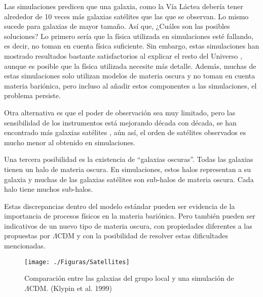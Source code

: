 \documentclass[a4paper,openright,12pt]{book}
\begin{document}
Las simulaciones predicen que una galaxia, como la Vía Láctea debería tener alrededor de 10 veces más galaxias satélites que las que se observan. Lo mismo sucede para galaxias de mayor tamaño. Así que, ¿Cuáles son las posibles soluciones? Lo primero sería que la física utilizada en simulaciones esté fallando, es decir, no toman en cuenta física suficiente. Sin embargo, estas simulaciones han mostrado resultados bastante satisfactorios al explicar el resto del Universo \cite{1.2.5}, aunque es posible que la física utilizada necesite más detalle. Además, muchas de estas simulaciones solo utilizan modelos de materia oscura y no toman en cuenta materia bariónica, pero incluso al añadir estos componentes a las simulaciones, el problema persiste.

Otra alternativa es que el poder de observación sea muy limitado, pero las sensibilidad de los instrumentos está mejorando década con década, se han encontrado más galaxias satélites \cite{1.2.6}, aún así, el orden de satélites observados es mucho menor al obtenido en simulaciones.

Una tercera posibilidad es la existencia de ``galaxias oscuras''. Todas las galaxias tienen un halo de materia oscura. En simulaciones, estos halos representan a su galaxia y muchas de las galaxias satélites son sub-halos de materia oscura. Cada halo tiene muchos sub-halos. 

Estas discrepancias dentro del modelo estándar pueden ser evidencia de la importancia de procesos físicos en la materia bariónica. Pero también pueden ser indicativos de un nuevo tipo de materia oscura, con propiedades diferentes a las propuestas por $\Lambda$CDM y con la posibilidad de resolver estas dificultades mencionadas.

\begin{figure}
\centering
 \texttt{[image: ./Figuras/Satellites]}
 \caption{\footnotesize{Comparación entre las galaxias del grupo local y una simulación de $\Lambda$CDM. (Klypin et al. 1999)}}
\end{figure}
\end{document}

